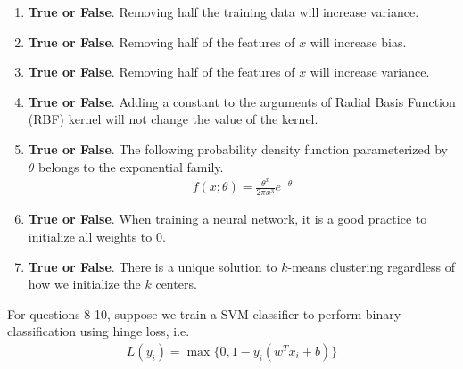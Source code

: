 \documentclass{article}
\newif\ifsolutions
\newenvironment{labelledanswer}{{\bf Answer:} \sf }{}%
\newcommand{\answer}[2]
{{
\ifsolutions
\begin{labelledanswer}
\color{red} 
#2
\end{labelledanswer}
\else
#1
\fi
}}
\begin{document}
\begin{enumerate}

\item \textbf{True or False}. Removing half the training data will increase variance.

\answer{}{Your Answer Here}

\item \textbf{True or False}. Removing half of the features of $x$ will increase bias.

\answer{}{}

\item \textbf{True or False}. Removing half of the features of $x$ will increase variance.

\answer{}{}

\item \textbf{True or False}. Adding a constant to the arguments of Radial Basis Function (RBF) kernel will not change the value of the kernel.

\answer{}{}

\item \textbf{True or False}. The following probability density function parameterized by $\theta$ belongs to the exponential family.
\begin{align}
f(x;\theta) = \frac{\theta^x}{2\pi x^3}e^{-\theta}
\end{align}

\answer{}{}

\item \textbf{True or False}. When training a neural network, it is a good practice to initialize all weights to $0$.

\answer{}{}

\item \textbf{True or False}. There is a unique solution to $k$-means clustering regardless of how we initialize the $k$ centers. 

\answer{}{}

\end{enumerate}

\noindent For questions 8-10, suppose we train a SVM classifier to perform binary classification using hinge loss, i.e. 
\begin{align}
    L(y_i) = \max\{0, 1 - y_i (w^T x_i + b)\} 
\end{align}
\end{document}
